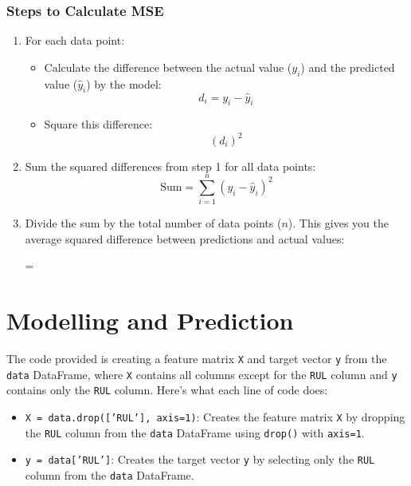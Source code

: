 \subsubsection{Steps to Calculate MSE}
\begin{enumerate}
    \item For each data point:
    \begin{itemize}
        \item Calculate the difference between the actual value ($y_i$) and the predicted value ($\hat{y}_i$) by the model:
        \begin{equation*}
            d_i = y_i - \hat{y}_i
        \end{equation*}
        \item Square this difference:
        \begin{equation*}
            (d_i)^2
        \end{equation*}
    \end{itemize}
    
    \item Sum the squared differences from step 1 for all data points:
    \begin{equation*}
        \text{Sum} = \sum_{i=1}^{n} (y_i - \hat{y}_i)^2
    \end{equation*}
    
    \item Divide the sum by the total number of data points ($n$). This gives you the average squared difference between predictions and actual values:
    \begin{equation**}
         = 
    \end{equation**}
\end{enumerate}

\section{Modelling and Prediction}
The code provided is creating a feature matrix \texttt{X} and target vector \texttt{y} from the \texttt{data} DataFrame, where \texttt{X} contains all columns except for the \texttt{RUL} column and \texttt{y} contains only the \texttt{RUL} column. Here’s what each line of code does:

\begin{itemize}
    \item \texttt{X = data.drop(['RUL'], axis=1)}: Creates the feature matrix \texttt{X} by dropping the \texttt{RUL} column from the \texttt{data} DataFrame using \texttt{drop()} with \texttt{axis=1}.
    \item \texttt{y = data['RUL']}: Creates the target vector \texttt{y} by selecting only the \texttt{RUL} column from the \texttt{data} DataFrame.
\end{itemize}

